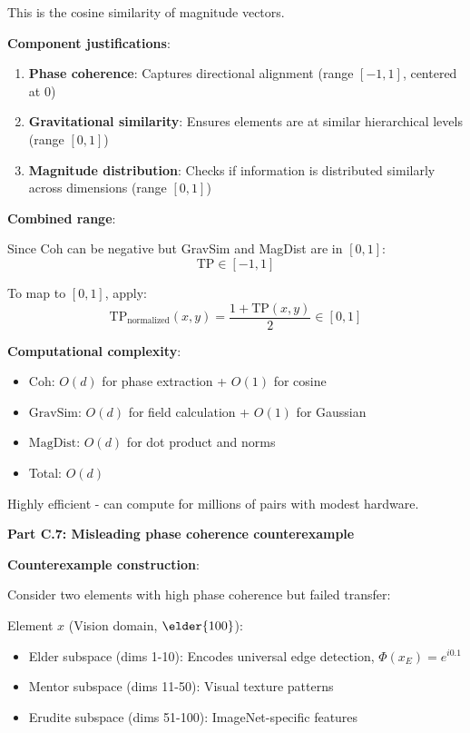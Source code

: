 This is the cosine similarity of magnitude vectors.

\textbf{Component justifications}:

\begin{enumerate}
\item \textbf{Phase coherence}: Captures directional alignment (range $[-1,1]$, centered at 0)
\item \textbf{Gravitational similarity}: Ensures elements are at similar hierarchical levels (range $[0,1]$)
\item \textbf{Magnitude distribution}: Checks if information is distributed similarly across dimensions (range $[0,1]$)
\end{enumerate}

\textbf{Combined range}:

Since Coh can be negative but GravSim and MagDist are in $[0,1]$:
$$\text{TP} \in [-1, 1]$$

To map to $[0,1]$, apply:
$$\text{TP}_{\text{normalized}}(x,y) = \frac{1 + \text{TP}(x,y)}{2} \in [0,1]$$

\textbf{Computational complexity}:

\begin{itemize}
\item $\text{Coh}$: $O(d)$ for phase extraction + $O(1)$ for cosine
\item $\text{GravSim}$: $O(d)$ for field calculation + $O(1)$ for Gaussian
\item $\text{MagDist}$: $O(d)$ for dot product and norms
\item Total: $O(d)$
\end{itemize}

Highly efficient - can compute for millions of pairs with modest hardware.

\textbf{Part C.7: Misleading phase coherence counterexample}

\textbf{Counterexample construction}:

Consider two elements with high phase coherence but failed transfer:

Element $x$ (Vision domain, $\elder{100}$):
\begin{itemize}
\item Elder subspace (dims 1-10): Encodes universal edge detection, $\Phi(x_E) = e^{i0.1}$
\item Mentor subspace (dims 11-50): Visual texture patterns
\item Erudite subspace (dims 51-100): ImageNet-specific features
\end{itemize}

